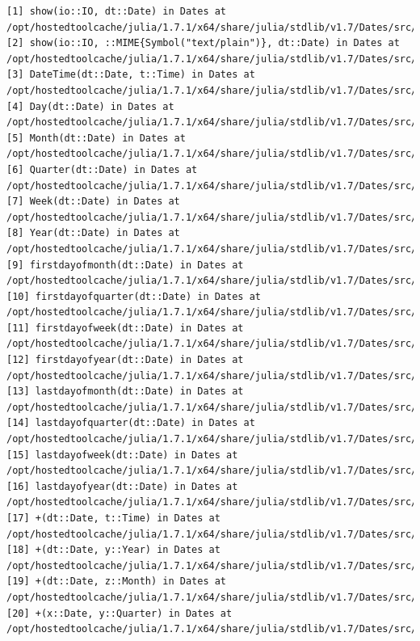\documentclass[
  notoc %
]{tufte-book}
\begin{document}
\begin{lstlisting}[language=Output]
[1] show(io::IO, dt::Date) in Dates at /opt/hostedtoolcache/julia/1.7.1/x64/share/julia/stdlib/v1.7/Dates/src/io.jl:707
[2] show(io::IO, ::MIME{Symbol("text/plain")}, dt::Date) in Dates at /opt/hostedtoolcache/julia/1.7.1/x64/share/julia/stdlib/v1.7/Dates/src/io.jl:705
[3] DateTime(dt::Date, t::Time) in Dates at /opt/hostedtoolcache/julia/1.7.1/x64/share/julia/stdlib/v1.7/Dates/src/types.jl:403
[4] Day(dt::Date) in Dates at /opt/hostedtoolcache/julia/1.7.1/x64/share/julia/stdlib/v1.7/Dates/src/periods.jl:36
[5] Month(dt::Date) in Dates at /opt/hostedtoolcache/julia/1.7.1/x64/share/julia/stdlib/v1.7/Dates/src/periods.jl:36
[6] Quarter(dt::Date) in Dates at /opt/hostedtoolcache/julia/1.7.1/x64/share/julia/stdlib/v1.7/Dates/src/periods.jl:36
[7] Week(dt::Date) in Dates at /opt/hostedtoolcache/julia/1.7.1/x64/share/julia/stdlib/v1.7/Dates/src/periods.jl:36
[8] Year(dt::Date) in Dates at /opt/hostedtoolcache/julia/1.7.1/x64/share/julia/stdlib/v1.7/Dates/src/periods.jl:36
[9] firstdayofmonth(dt::Date) in Dates at /opt/hostedtoolcache/julia/1.7.1/x64/share/julia/stdlib/v1.7/Dates/src/adjusters.jl:84
[10] firstdayofquarter(dt::Date) in Dates at /opt/hostedtoolcache/julia/1.7.1/x64/share/julia/stdlib/v1.7/Dates/src/adjusters.jl:157
[11] firstdayofweek(dt::Date) in Dates at /opt/hostedtoolcache/julia/1.7.1/x64/share/julia/stdlib/v1.7/Dates/src/adjusters.jl:52
[12] firstdayofyear(dt::Date) in Dates at /opt/hostedtoolcache/julia/1.7.1/x64/share/julia/stdlib/v1.7/Dates/src/adjusters.jl:119
[13] lastdayofmonth(dt::Date) in Dates at /opt/hostedtoolcache/julia/1.7.1/x64/share/julia/stdlib/v1.7/Dates/src/adjusters.jl:100
[14] lastdayofquarter(dt::Date) in Dates at /opt/hostedtoolcache/julia/1.7.1/x64/share/julia/stdlib/v1.7/Dates/src/adjusters.jl:180
[15] lastdayofweek(dt::Date) in Dates at /opt/hostedtoolcache/julia/1.7.1/x64/share/julia/stdlib/v1.7/Dates/src/adjusters.jl:68
[16] lastdayofyear(dt::Date) in Dates at /opt/hostedtoolcache/julia/1.7.1/x64/share/julia/stdlib/v1.7/Dates/src/adjusters.jl:135
[17] +(dt::Date, t::Time) in Dates at /opt/hostedtoolcache/julia/1.7.1/x64/share/julia/stdlib/v1.7/Dates/src/arithmetic.jl:19
[18] +(dt::Date, y::Year) in Dates at /opt/hostedtoolcache/julia/1.7.1/x64/share/julia/stdlib/v1.7/Dates/src/arithmetic.jl:27
[19] +(dt::Date, z::Month) in Dates at /opt/hostedtoolcache/julia/1.7.1/x64/share/julia/stdlib/v1.7/Dates/src/arithmetic.jl:54
[20] +(x::Date, y::Quarter) in Dates at /opt/hostedtoolcache/julia/1.7.1/x64/share/julia/stdlib/v1.7/Dates/src/arithmetic.jl:73
\end{lstlisting}
\end{document}
